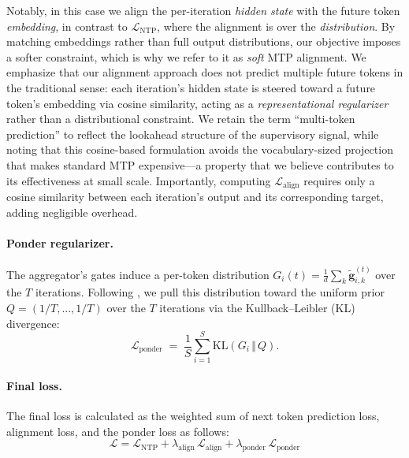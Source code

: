 Notably, in this case we align the per-iteration \emph{hidden state} with the future token \emph{embedding}, in contrast to $\mathcal{L}_\text{NTP}$, where the alignment is over the \emph{distribution}. By matching embeddings rather than full output distributions, our objective imposes a softer constraint, which is why we refer to it as \emph{soft} MTP alignment. 
We emphasize that our alignment approach does not predict multiple future tokens
in the traditional sense: each iteration's hidden state is steered toward a future
token's embedding via cosine similarity, acting as a \emph{representational regularizer}
rather than a distributional constraint.  We retain the term ``multi-token
prediction'' to reflect the lookahead structure of the supervisory signal, while
noting that this cosine-based formulation avoids the vocabulary-sized projection that makes standard MTP expensive---a property that we believe contributes to its
effectiveness at small scale.
Importantly, computing $\mathcal{L}_\text{align}$ requires only a cosine similarity between each iteration's output and its corresponding target, adding negligible overhead.



\paragraph{Ponder regularizer.}
The aggregator's gates induce a per-token distribution
$G_i(t) {=} \tfrac{1}{d}\sum_{k} \tilde{\mathbf{g}}^{(t)}_{i,k}$ over the
$T$ iterations. 
Following \citet{zhu2025scaling}, we pull this distribution toward the uniform
prior $Q {=} (1/T, \dots, 1/T)$ over the $T$
iterations via the Kullback--Leibler (KL) divergence:
\begin{equation}
  \mathcal{L}_{\text{ponder}} \;=\; \frac{1}{S}\sum_{i=1}^{S} \mathrm{KL}\!\left(G_i \,\Vert\, Q\right).
\end{equation}


\paragraph{Final loss.}
The final loss is calculated as the weighted sum of next token prediction loss, alignment loss, and the ponder loss as follows:
\begin{equation}    
    \mathcal{L} = \mathcal{L}_{\text{NTP}}
      + \lambda_{\text{align}}\, \mathcal{L}_{\text{align}}
      + \lambda_{\text{ponder}}\, \mathcal{L}_{\text{ponder}}
  \label{eq:total}
\end{equation}
